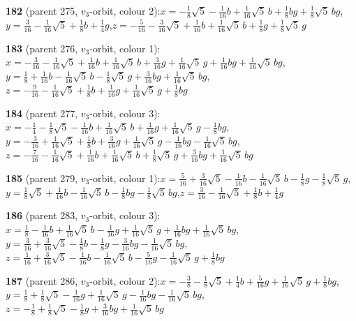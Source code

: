 \documentclass[10pt]{article}
\begin{document}
{\noindent\textbf{182} (parent 275, $v_3$-orbit, colour 2):\quad $x=-\tfrac{1}{8}\sqrt5-\tfrac{1}{16}b+\tfrac{1}{16}\sqrt5\,b+\tfrac{1}{8}bg+\tfrac{1}{8}\sqrt5\,bg$,\quad $y=\tfrac{3}{16}-\tfrac{1}{16}\sqrt5+\tfrac{1}{8}b+\tfrac{1}{4}g$,\quad $z=-\tfrac{5}{16}-\tfrac{3}{16}\sqrt5+\tfrac{1}{16}b+\tfrac{1}{16}\sqrt5\,b+\tfrac{1}{8}g+\tfrac{1}{8}\sqrt5\,g$\par\smallskip
\noindent\textbf{183} (parent 276, $v_3$-orbit, colour 1):\quad $x=-\tfrac{3}{16}-\tfrac{1}{16}\sqrt5+\tfrac{1}{16}b+\tfrac{1}{16}\sqrt5\,b+\tfrac{3}{16}g+\tfrac{1}{16}\sqrt5\,g+\tfrac{1}{16}bg+\tfrac{1}{16}\sqrt5\,bg$,\quad $y=\tfrac{1}{8}+\tfrac{1}{16}b-\tfrac{1}{16}\sqrt5\,b-\tfrac{1}{8}\sqrt5\,g+\tfrac{3}{16}bg+\tfrac{1}{16}\sqrt5\,bg$,\quad $z=-\tfrac{9}{16}-\tfrac{1}{16}\sqrt5+\tfrac{1}{8}b+\tfrac{1}{16}g+\tfrac{1}{16}\sqrt5\,g+\tfrac{1}{8}bg$\par\smallskip
\noindent\textbf{184} (parent 277, $v_3$-orbit, colour 3):\quad $x=-\tfrac{1}{4}-\tfrac{1}{8}\sqrt5-\tfrac{1}{16}b+\tfrac{1}{16}\sqrt5\,b+\tfrac{1}{16}g+\tfrac{1}{16}\sqrt5\,g-\tfrac{1}{8}bg$,\quad $y=-\tfrac{3}{16}+\tfrac{1}{16}\sqrt5+\tfrac{1}{8}b+\tfrac{3}{16}g+\tfrac{1}{16}\sqrt5\,g-\tfrac{1}{16}bg-\tfrac{1}{16}\sqrt5\,bg$,\quad $z=-\tfrac{7}{16}-\tfrac{1}{16}\sqrt5+\tfrac{1}{16}b+\tfrac{1}{16}\sqrt5\,b+\tfrac{1}{8}\sqrt5\,g+\tfrac{3}{16}bg+\tfrac{1}{16}\sqrt5\,bg$\par\smallskip
\noindent\textbf{185} (parent 279, $v_3$-orbit, colour 1):\quad $x=\tfrac{5}{16}+\tfrac{3}{16}\sqrt5-\tfrac{1}{16}b-\tfrac{1}{16}\sqrt5\,b-\tfrac{1}{8}g-\tfrac{1}{8}\sqrt5\,g$,\quad $y=\tfrac{1}{8}\sqrt5+\tfrac{1}{16}b-\tfrac{1}{16}\sqrt5\,b-\tfrac{1}{8}bg-\tfrac{1}{8}\sqrt5\,bg$,\quad $z=\tfrac{3}{16}-\tfrac{1}{16}\sqrt5+\tfrac{1}{8}b+\tfrac{1}{4}g$\par\smallskip
\noindent\textbf{186} (parent 283, $v_3$-orbit, colour 3):\quad $x=\tfrac{1}{8}-\tfrac{1}{16}b+\tfrac{1}{16}\sqrt5\,b-\tfrac{1}{16}g+\tfrac{1}{16}\sqrt5\,g+\tfrac{1}{16}bg+\tfrac{1}{16}\sqrt5\,bg$,\quad $y=\tfrac{3}{16}+\tfrac{3}{16}\sqrt5-\tfrac{1}{8}b-\tfrac{1}{8}g-\tfrac{3}{16}bg-\tfrac{1}{16}\sqrt5\,bg$,\quad $z=\tfrac{1}{16}+\tfrac{3}{16}\sqrt5-\tfrac{1}{16}b-\tfrac{1}{16}\sqrt5\,b-\tfrac{5}{16}g-\tfrac{1}{16}\sqrt5\,g+\tfrac{1}{8}bg$\par\smallskip
\noindent\textbf{187} (parent 286, $v_3$-orbit, colour 2):\quad $x=-\tfrac{3}{8}-\tfrac{1}{8}\sqrt5+\tfrac{1}{4}b+\tfrac{5}{16}g+\tfrac{1}{16}\sqrt5\,g+\tfrac{1}{8}bg$,\quad $y=\tfrac{1}{8}+\tfrac{1}{8}\sqrt5-\tfrac{1}{16}g+\tfrac{1}{16}\sqrt5\,g-\tfrac{1}{16}bg-\tfrac{1}{16}\sqrt5\,bg$,\quad $z=-\tfrac{1}{8}+\tfrac{1}{8}\sqrt5-\tfrac{1}{8}g+\tfrac{3}{16}bg+\tfrac{1}{16}\sqrt5\,bg$\par\smallskip
}
\end{document}
